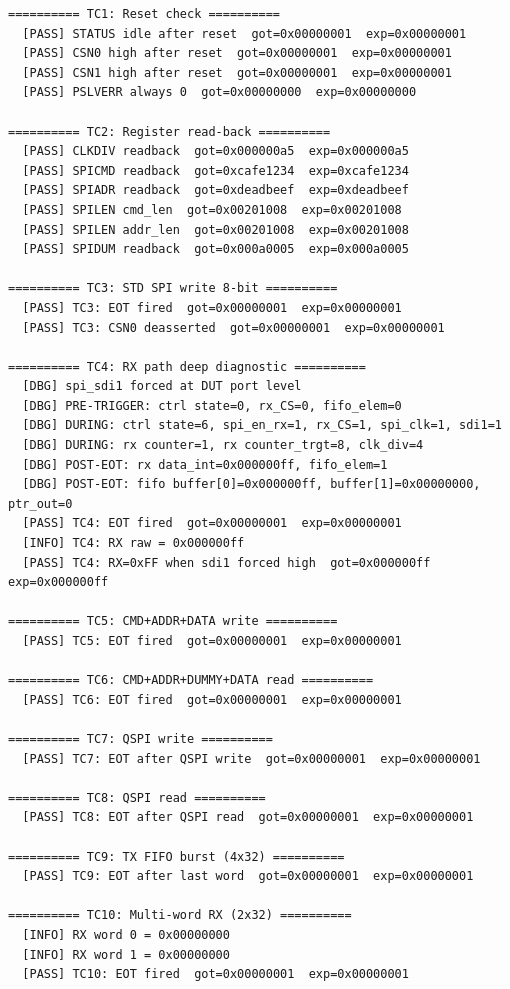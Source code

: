 \begin{lstlisting}[basicstyle=\ttfamily\scriptsize,numbers=none,frame=single,breaklines=true]
========== TC1: Reset check ==========
  [PASS] STATUS idle after reset  got=0x00000001  exp=0x00000001
  [PASS] CSN0 high after reset  got=0x00000001  exp=0x00000001
  [PASS] CSN1 high after reset  got=0x00000001  exp=0x00000001
  [PASS] PSLVERR always 0  got=0x00000000  exp=0x00000000

========== TC2: Register read-back ==========
  [PASS] CLKDIV readback  got=0x000000a5  exp=0x000000a5
  [PASS] SPICMD readback  got=0xcafe1234  exp=0xcafe1234
  [PASS] SPIADR readback  got=0xdeadbeef  exp=0xdeadbeef
  [PASS] SPILEN cmd_len  got=0x00201008  exp=0x00201008
  [PASS] SPILEN addr_len  got=0x00201008  exp=0x00201008
  [PASS] SPIDUM readback  got=0x000a0005  exp=0x000a0005

========== TC3: STD SPI write 8-bit ==========
  [PASS] TC3: EOT fired  got=0x00000001  exp=0x00000001
  [PASS] TC3: CSN0 deasserted  got=0x00000001  exp=0x00000001

========== TC4: RX path deep diagnostic ==========
  [DBG] spi_sdi1 forced at DUT port level
  [DBG] PRE-TRIGGER: ctrl state=0, rx_CS=0, fifo_elem=0
  [DBG] DURING: ctrl state=6, spi_en_rx=1, rx_CS=1, spi_clk=1, sdi1=1
  [DBG] DURING: rx counter=1, rx counter_trgt=8, clk_div=4
  [DBG] POST-EOT: rx data_int=0x000000ff, fifo_elem=1
  [DBG] POST-EOT: fifo buffer[0]=0x000000ff, buffer[1]=0x00000000, ptr_out=0
  [PASS] TC4: EOT fired  got=0x00000001  exp=0x00000001
  [INFO] TC4: RX raw = 0x000000ff
  [PASS] TC4: RX=0xFF when sdi1 forced high  got=0x000000ff  exp=0x000000ff

========== TC5: CMD+ADDR+DATA write ==========
  [PASS] TC5: EOT fired  got=0x00000001  exp=0x00000001

========== TC6: CMD+ADDR+DUMMY+DATA read ==========
  [PASS] TC6: EOT fired  got=0x00000001  exp=0x00000001

========== TC7: QSPI write ==========
  [PASS] TC7: EOT after QSPI write  got=0x00000001  exp=0x00000001

========== TC8: QSPI read ==========
  [PASS] TC8: EOT after QSPI read  got=0x00000001  exp=0x00000001

========== TC9: TX FIFO burst (4x32) ==========
  [PASS] TC9: EOT after last word  got=0x00000001  exp=0x00000001

========== TC10: Multi-word RX (2x32) ==========
  [INFO] RX word 0 = 0x00000000
  [INFO] RX word 1 = 0x00000000
  [PASS] TC10: EOT fired  got=0x00000001  exp=0x00000001


\end{lstlisting}
